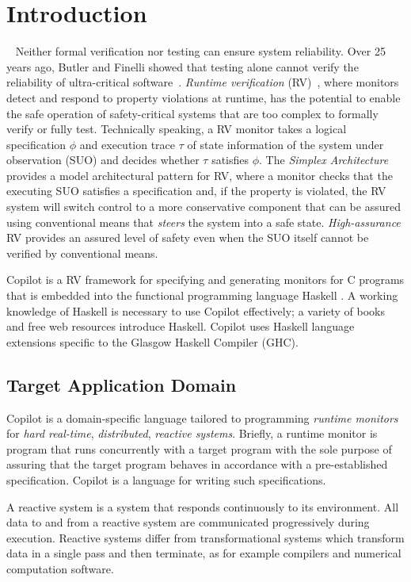
\section{Introduction} \label{sec:introduction}

 
Neither formal verification nor testing can ensure system reliability.
Over 25 years ago, Butler and Finelli showed that testing alone cannot verify
the reliability of ultra-critical software~\cite{butler}.
\emph{Runtime verification} (RV)~\cite{monitors}, where monitors
detect and respond to property violations at runtime, has the
potential to enable the safe operation of safety-critical systems that
are too complex to formally verify or fully test.  Technically
speaking, a RV monitor takes a logical specification $\phi$ and
execution trace $\tau$ of state information of the system under
observation (SUO) and decides whether $\tau$ satisfies $\phi$. The
\emph{Simplex Architecture}~\cite{simplex} provides a model
architectural pattern for RV, where a monitor checks that the
executing SUO satisfies a specification and, if the property is
violated, the RV system will switch control to a more conservative
component that can be assured using conventional means that
\emph{steers} the system into a safe state.  \emph{High-assurance} RV
provides an assured level of safety even when the SUO itself cannot be
verified by conventional means.


Copilot is a RV framework for specifying and generating monitors for C programs that is
embedded into the functional programming language Haskell
\cite{PeytonJones02}.  A working knowledge of Haskell is necessary to use
Copilot effectively; a variety of books and free web resources introduce Haskell.
Copilot uses Haskell language extensions
specific to the Glasgow Haskell Compiler (GHC).

\subsection{Target Application Domain} \label{domain}


Copilot is a domain-specific language tailored to programming \emph{runtime
monitors} for \emph{hard real-time}, \emph{distributed}, \emph{reactive systems}.
Briefly, a runtime monitor is program that runs concurrently with a target program
with the sole purpose of assuring that the target program behaves in accordance with a
pre-established specification. Copilot is a language for writing such specifications.

A reactive system is a system that responds continuously to its environment.
All data to and from a reactive system are communicated progressively during
execution. Reactive systems differ from transformational systems which transform
data in a single pass and then terminate, as for example compilers and numerical
computation software.

